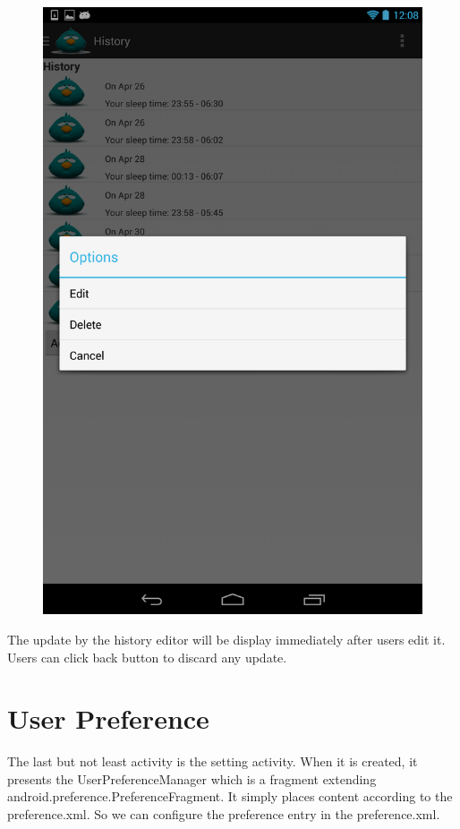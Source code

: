 \documentclass[14pt]{extreport}
\begin{document}
\begin{figure}[h]
\begin{center}
\includegraphics[width=5in]{edithistory}
\end{center}
\end{figure}

The update by the history editor will be display immediately after users edit it. Users can click back button to discard any update.

\chapter{User Preference}
The last but not least activity is the setting activity. When it is created, it presents the UserPreferenceManager which is a fragment extending android.preference.PreferenceFragment. It simply places content according to the preference.xml. So we can configure the preference entry in the preference.xml.
\end{document}
